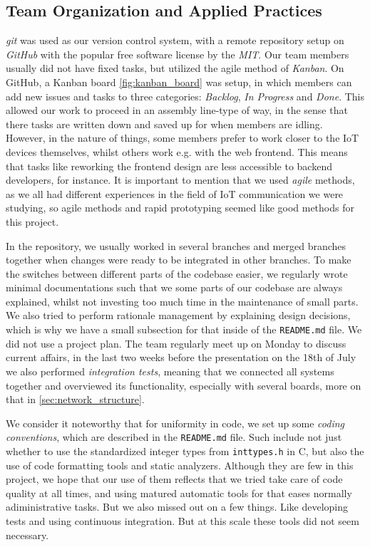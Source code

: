 \documentclass[acmtog, language=english, nonacm]{acmart}
\begin{document}
    \subsection{Team Organization and Applied Practices}

    \emph{git} was used as our version control system, with a remote repository setup on \emph{GitHub} with the popular free software license by the \emph{MIT}. Our team members usually did not have fixed tasks, but utilized the agile method of \emph{Kanban}. On GitHub, a Kanban board \cref{fig:kanban_board} was setup, in which members can add new issues and tasks to three categories: \emph{Backlog}, \emph{In Progress} and \emph{Done}. This allowed our work to proceed in an assembly line-type of way, in the sense that there tasks are written down and saved up for when members are idling. However, in the nature of things, some members prefer to work closer to the IoT devices themselves, whilst others work e.g. with the web frontend. This means that tasks like reworking the frontend design are less accessible to backend developers, for instance. It is important to mention that we used \emph{agile} methods, as we all had different experiences in the field of IoT communication we were studying, so agile methods and rapid prototyping seemed like good methods for this project.

    In the repository, we usually worked in several branches and merged branches together when changes were ready to be integrated in other branches. To make the switches between different parts of the codebase easier, we regularly wrote minimal documentations such that we some parts of our codebase are always explained, whilst not investing too much time in the maintenance of small parts. We also tried to perform rationale management by explaining design decisions, which is why we have a small subsection for that inside of the \texttt{README.md} file. We did not use a project plan. The team regularly meet up on Monday to discuss current affairs, in the last two weeks before the presentation on the 18th of July we also performed \emph{integration tests}, meaning that we connected all systems together and overviewed its functionality, especially with several boards, more on that in \cref{sec:network_structure}.

    We consider it noteworthy that for uniformity in code, we set up some \emph{coding conventions}, which are described in the \texttt{README.md} file. Such include not just whether to use the standardized integer types from \texttt{inttypes.h} in C, but also the use of code formatting tools and static analyzers. Although they are few in this project, we hope that our use of them reflects that we tried take care of code quality at all times, and using matured automatic tools for that eases normally adiministrative tasks. But we also missed out on a few things. Like developing tests and using continuous integration. But at this scale these tools did not seem necessary.
\end{document}
